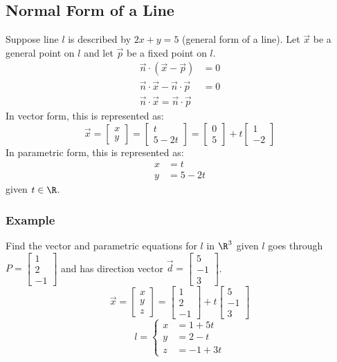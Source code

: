 \documentclass{math}
\begin{document}
\subsection*{Normal Form of a Line}
Suppose line \( l \) is described by \( 2x+y = 5 \) (general form of a line).
Let \( \vec{x} \) be a general point on \( l \) and let \( \vec{p} \) be a
fixed point on \( l \).
\begin{align*}
  \vec{n}\cdot(\vec{x}-\vec{p}) &= 0 \\
  \vec{n}\cdot\vec{x}-\vec{n}\cdot\vec{p} &= 0 \\
  \vec{n}\cdot\vec{x} = \vec{n}\cdot\vec{p}
\end{align*}
In vector form, this is represented as:
\[ \vec{x} = \begin{bmatrix}x \\ y\end{bmatrix} =
  \begin{bmatrix}t \\ 5-2t\end{bmatrix} =
  \begin{bmatrix}0 \\ 5\end{bmatrix}+
  t\begin{bmatrix}1 \\ -2\end{bmatrix} \]
In parametric form, this is represented as:
\begin{align*}
  x &= t \\
  y &= 5-2t
\end{align*}
given \( t\in\R \).

\subsubsection*{Example}
Find the vector and parametric equations for \( l \) in \( \R^3 \) given \( l \)
goes through \( P = \begin{bmatrix}1 \\ 2 \\ -1\end{bmatrix} \) and has
direction vector \( \vec{d} = \begin{bmatrix}5 \\ -1 \\ 3\end{bmatrix} \).
\[ \vec{x} = \begin{bmatrix}x \\ y \\ z\end{bmatrix} =
  \begin{bmatrix}1 \\ 2 \\ -1\end{bmatrix}+
  t\begin{bmatrix}5 \\ -1 \\ 3\end{bmatrix} \]
\[ l = \begin{cases}
  x &= 1+5t \\
  y &= 2-t \\
  z &= -1+3t
\end{cases} \]
\end{document}
